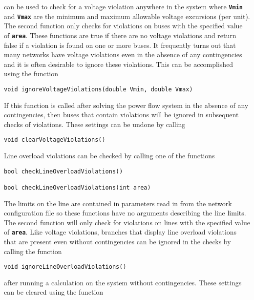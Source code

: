 can be used to check for a voltage violation anywhere in the system where \texttt{\textbf{Vmin}} and \texttt{\textbf{Vmax}} are the minimum and maximum allowable voltage excursions (per unit). The second function only checks for violations on buses with the specified value of \texttt{\textbf{area}}. These functions are true if there are no voltage violations and return false if a violation is found on one or more buses. It frequently turns out that many networks have voltage violations even in the absence of any contingencies and it is often desirable to ignore these violations. This can be accomplished using the function

{
\color{red}
\begin{Verbatim}[fontseries=b]
void ignoreVoltageViolations(double Vmin, double Vmax)
\end{Verbatim}
}

If this function is called after solving the power flow system in the absence of any contingencies, then buses that contain violations will be ignored in subsequent checks of violations. These settings can be undone by calling

{
\color{red}
\begin{Verbatim}[fontseries=b]
void clearVoltageViolations()
\end{Verbatim}
}

Line overload violations can be checked by calling one of the functions

{
\color{red}
\begin{Verbatim}[fontseries=b]
bool checkLineOverloadViolations()

bool checkLineOverloadViolations(int area)
\end{Verbatim}
}

The limits on the line are contained in parameters read in from the network configuration file so these functions have no arguments describing the line limits. The second function will only check for violations on lines with the specified value of \texttt{\textbf{area}}. Like voltage violations, branches that display line overload violations that are present even without contingencies can be ignored in the checks by calling the function

{
\color{red}
\begin{Verbatim}[fontseries=b]
void ignoreLineOverloadViolations()
\end{Verbatim}
}

after running a calculation on the system without contingencies. These settings can be cleared using the function

